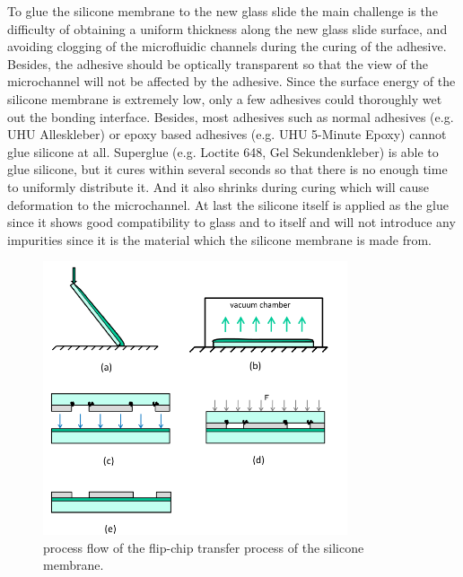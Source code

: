To glue the silicone membrane to the new glass slide the main challenge is the difficulty of obtaining a uniform thickness along the new glass slide surface, and avoiding clogging of the microfluidic channels during the curing of the adhesive. Besides, the adhesive should be optically transparent so that the view of the microchannel will not be affected by the adhesive. Since the surface energy of the silicone membrane is extremely low, only a few adhesives could thoroughly wet out the bonding interface. Besides, most adhesives such as normal adhesives (e.g. UHU Alleskleber) or epoxy based adhesives (e.g. UHU 5-Minute Epoxy) cannot glue silicone at all. Superglue (e.g. Loctite 648, Gel Sekundenkleber) is able to glue silicone, but it cures within several seconds so that there is no enough time to uniformly distribute it. And it also shrinks during curing which will cause deformation to the microchannel. At last the silicone itself is applied as the glue since it shows good compatibility to glass and to itself and will not introduce any impurities since it is the material which the silicone membrane is made from.\\

\begin{figure}[h]%
\centering
\includegraphics[width=0.8\textwidth]{figures/designandfabrication/figure3_12}%
\caption{process flow of the flip-chip transfer process of the silicone membrane.}%
\label{figure3_12}%
\end{figure}

